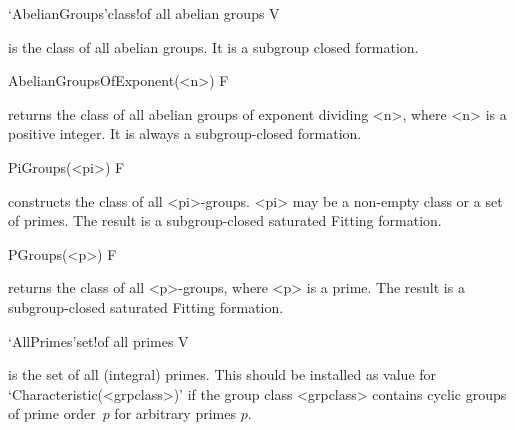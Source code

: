 \>`AbelianGroups'{class}!{of all abelian groups} V

%
is the class of all abelian groups. It is a subgroup closed formation.




\>AbelianGroupsOfExponent(<n>) F

returns the class of all abelian groups of exponent dividing <n>, 
where <n> is
a positive integer. It is always a subgroup-closed formation.


\>PiGroups(<pi>) F

constructs the class of all <pi>-groups.  <pi> may be a non-empty class or a
set of primes. The result is a subgroup-closed saturated Fitting formation.


\>PGroups(<p>) F

returns the class of all <p>-groups, where <p> is a prime.  The result is a
subgroup-closed saturated Fitting formation.


\>`AllPrimes'{set}!{of all primes} V

%
\label{AllPrimes}%
is the set of all (integral) primes. This should be
installed as value for `Characteristic(<grpclass>)' if the group class
<grpclass> contains cyclic groups of prime order~$p$ for arbitrary primes $p$.



